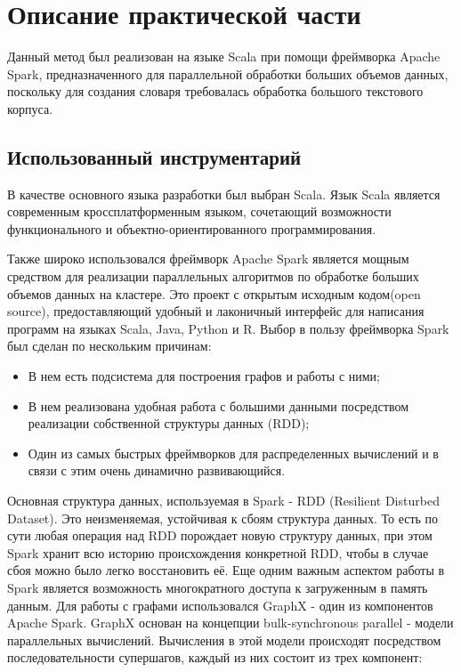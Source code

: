 \chapter{Описание практической части}
Данный метод был реализован на языке Scala при помощи фреймворка Apache
Spark, предназначенного для параллельной обработки больших объемов данных,
поскольку для создания словаря требовалась обработка большого текстового
корпуса.

\section{Использованный инструментарий}
В качестве основного языка разработки был выбран Scala. Язык Scala является
современным кроссплатформенным языком, сочетающий возможности функционального и
объектно-ориентированного программирования.

Также широко использовался фреймворк Apache Spark является мощным средством для
реализации параллельных алгоритмов по обработке больших объемов данных на
кластере. Это проект с открытым исходным кодом(open source), предоставляющий
удобный и лаконичный интерфейс для написания программ на языках Scala, Java,
Python и R. Выбор в пользу фреймворка Spark был сделан по нескольким причинам:

\begin{itemize}
  \item В нем есть подсистема для построения графов и работы с ними; 
  \item В нем реализована удобная работа с большими данными посредством реализации собственной структуры данных (RDD);
  \item Один из самых быстрых фреймворков для распределенных вычислений и в связи с этим очень динамично развивающийся.
\end{itemize}

Основная структура данных, используемая в Spark - RDD (Resilient Disturbed
Dataset). Это неизменяемая, устойчивая к сбоям структура данных. То есть по сути
любая операция над RDD порождает новую структуру данных, при этом Spark
хранит всю историю происхождения конкретной RDD, чтобы в случае сбоя можно
было легко восстановить её. Еще одним важным аспектом работы в Spark является
возможность многократного доступа к загруженным в память данным.
Для работы с графами использовался GraphX - один из компонентов Apache
Spark. GraphX основан на концепции bulk-synchronous parallel - модели
параллельных вычислений. Вычисления в этой модели происходят посредством
последовательности супершагов, каждый из них состоит из трех компонент:

